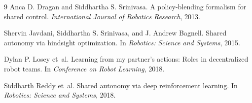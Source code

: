 \documentclass{article}
\begin{document}
\begin{thebibliography}{9}
Anca D. Dragan and Siddhartha S. Srinivasa.
\newblock A policy-blending formalism for shared control.
\newblock \emph{International Journal of Robotics Research}, 2013.

Shervin Javdani, Siddhartha S. Srinivasa, and J. Andrew Bagnell.
\newblock Shared autonomy via hindsight optimization.
\newblock In \emph{Robotics: Science and Systems}, 2015.

Dylan P. Losey et~al.
\newblock Learning from my partner's actions: Roles in decentralized robot teams.
\newblock In \emph{Conference on Robot Learning}, 2018.

Siddharth Reddy et~al.
\newblock Shared autonomy via deep reinforcement learning.
\newblock In \emph{Robotics: Science and Systems}, 2018.
\end{thebibliography}
\end{document}
